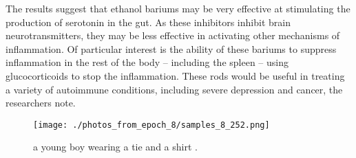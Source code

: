 \documentclass{article}%
\begin{document}
The results suggest that ethanol bariums may be very effective at stimulating the production of serotonin in the gut. As these inhibitors inhibit brain neurotransmitters, they may be less effective in activating other mechanisms of inflammation.\newline%
Of particular interest is the ability of these bariums to suppress inflammation in the rest of the body – including the spleen – using glucocorticoids to stop the inflammation.\newline%
These rods would be useful in treating a variety of autoimmune conditions, including severe depression and cancer, the researchers note.\newline%

%


\begin{figure}[h!]%
\centering%
\texttt{[image: ./photos\_from\_epoch\_8/samples\_8\_252.png]}%
\caption{a young boy wearing a tie and a shirt .}%
\end{figure}

%
\end{document}
